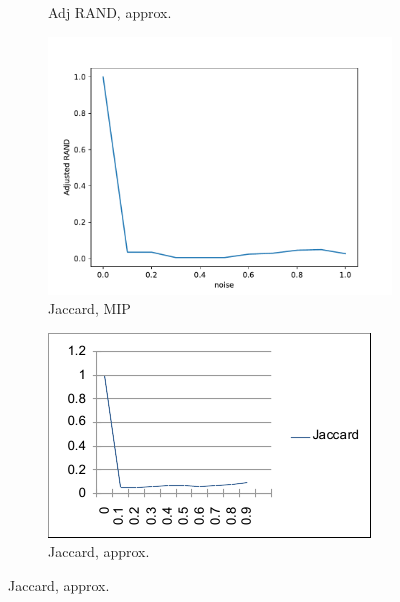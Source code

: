 \documentclass{beamer}
\begin{document}
\begin{frame}[c]
\begin{figure}
\begin{center}
\begin{subfigure}[b]{0.3\textwidth}
				\caption{Adj RAND, approx.}
				\label{fig:adj-rand-appr1}
			\end{subfigure}
		\end{center}
		\begin{center}
			\begin{subfigure}[b]{0.3\textwidth}
				\centering
				\includegraphics[width=\textwidth]{out/synthetic_exact/model2_noise_adj_rand.pdf}
				\caption{Jaccard, MIP}
				\label{fig:out/synthetic_exact/model2_sigmas_jaccard.pdf}
			\end{subfigure}
			\begin{subfigure}[b]{0.3\textwidth}
				\centering
				\includegraphics[width=\textwidth]{out/synthetic_approximation/jacc.png}
				\caption{Jaccard, approx.}
				\label{fig:jacc-appr1}
			\end{subfigure}
		\end{center}
	\end{figure}

\end{frame}
\end{document}
